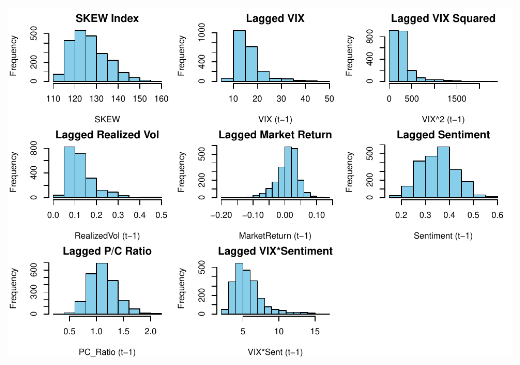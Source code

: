 \documentclass[
]{article}
\begin{document}
\includegraphics{FinalProject_files/figure-latex/exploratory-data-analysis-1.pdf}
\end{document}
